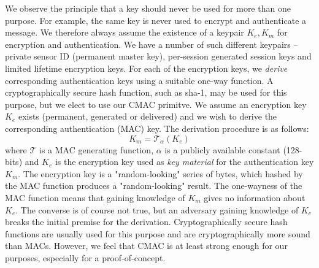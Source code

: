 We observe the principle that a key should never be used for more than one purpose. For example, the same key is never used to encrypt and authenticate a message. We therefore always assume the existence of a keypair $K_e,K_m$ for encryption and authentication.
%
We have a number of such different keypairs -- private sensor ID (permanent master key), per-session generated session keys and limited lifetime encryption keys. For each of the encryption keys, we \textit{derive} corresponding authentication keys using a suitable one-way function. A cryptographically secure hash function, such as sha-1, may be used for this purpose, but we elect to use our CMAC primitve. We assume an encryption key $K_e$ exists (permanent, generated or delivered) and we wish to derive the corresponding authentication (MAC) key. The derivation procedure is as follows:
\[
K_m = \mathcal{T}_\alpha(K_e)
\]
where $\mathcal{T}$ is a MAC generating function, $\alpha$ is a publicly available constant (128-bits) and $K_e$ is the encryption key used as \textit{key material} for the authentication key $K_m$. The encryption key is a "random-looking" series of bytes, which hashed by the MAC function produces a "random-looking" result. The one-wayness of the MAC function means that gaining knowledge of $K_m$ gives no information about $K_e$. The converse is of course not true, but an adversary gaining knowledge of $K_e$ breaks the initial premise for the derivation. Cryptographically secure hash functions are usually used for this purpose and are cryptographically more sound than MACs. However, we feel that CMAC is at least strong enough for our purposes, especially for a proof-of-concept.


